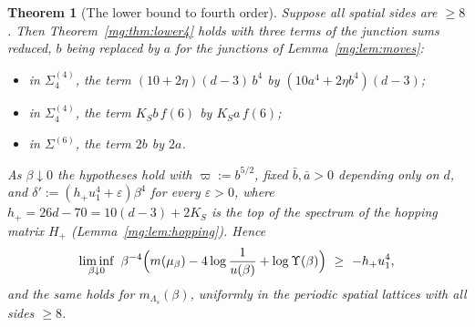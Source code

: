 \documentclass[11pt,a4paper]{article}
\newtheorem{theorem}{Theorem}[section]
\theoremstyle{definition}
\theoremstyle{remark}
\begin{document}
\begin{theorem}[The lower bound to fourth order]\label{mg:thm:lower5}
Suppose all spatial sides are $\ge8$. Then Theorem~\ref{mg:thm:lower4} holds with three terms of the junction sums reduced, $b$ being replaced by $a$ for the junctions
of Lemma~\ref{mg:lem:moves}:
\begin{itemize}
\item in $\Sigma^{(4)}_4$, the term $(10+2\eta)(d-3)\,b^4$ by $(10a^4+2\eta b^4)(d-3)$;
\item in $\Sigma^{(4)}_4$, the term $K_Sb\,f(6)$ by $K_Sa\,f(6)$;
\item in $\Sigma^{(6)}$, the term $2b$ by $2a$.
\end{itemize}
As $\beta\downarrow0$ the hypotheses hold with $\varpi:=b^{5/2}$, fixed $\bar b,\bar a>0$ depending only on $d$, and $\delta':=(h_+u_1^4+\varepsilon)\beta^4$ for every $\varepsilon>0$, where
$h_+=26d-70=10(d-3)+2K_S$ is the top of the spectrum of the hopping matrix $H_+$ (Lemma~\ref{mg:lem:hopping}). Hence
\[
\liminf_{\beta\downarrow0}\ \beta^{-4}\Bigl(m(\mu_\beta)-4\log\frac1{u(\beta)}+\log\Upsilon(\beta)\Bigr)\ \ge\ -h_+u_1^4,
\]
and the same holds for $m_{\Lambda_s}(\beta)$, uniformly in the periodic spatial lattices with all sides $\ge8$.
\end{theorem}
\end{document}
